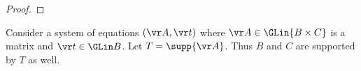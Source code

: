 \begin{proof}
\end{proof}


%

Consider a system of equations $(\vr A, \vr t)$ where $\vr A\in\GLin{B\times C}$ is a matrix
and $\vr t\in\GLin B$.
Let $T = \supp{\vr A}$. %
Thus $B$ and $C$ are supported by $T$ as well.
%

